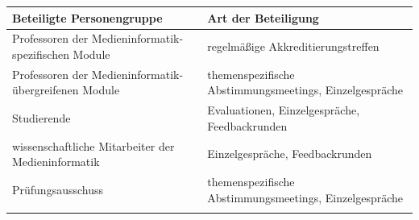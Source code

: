 \begin{longtable}[c]{@{}ll@{}}
\toprule
\begin{minipage}[b]{0.5\columnwidth}\raggedright\strut
Beteiligte Personengruppe
\strut\end{minipage} &
\begin{minipage}[b]{0.5\columnwidth}\raggedright\strut
Art der Beteiligung
\strut\end{minipage}\tabularnewline
\midrule
\endhead
\begin{minipage}[t]{0.5\columnwidth}\raggedright\strut
Professoren der Medieninformatik-spezifischen Module
\strut\end{minipage} &
\begin{minipage}[t]{0.5\columnwidth}\raggedright\strut
regelmäßige Akkreditierungstreffen
\strut\end{minipage}\tabularnewline
\begin{minipage}[t]{0.5\columnwidth}\raggedright\strut
Professoren der Medieninformatik-übergreifenen Module
\strut\end{minipage} &
\begin{minipage}[t]{0.5\columnwidth}\raggedright\strut
themenspezifische Abstimmungsmeetings, Einzelgespräche
\strut\end{minipage}\tabularnewline
\begin{minipage}[t]{0.5\columnwidth}\raggedright\strut
Studierende
\strut\end{minipage} &
\begin{minipage}[t]{0.5\columnwidth}\raggedright\strut
Evaluationen, Einzelgespräche, Feedbackrunden
\strut\end{minipage}\tabularnewline
\begin{minipage}[t]{0.5\columnwidth}\raggedright\strut
wissenschaftliche Mitarbeiter der Medieninformatik
\strut\end{minipage} &
\begin{minipage}[t]{0.5\columnwidth}\raggedright\strut
Einzelgespräche, Feedbackrunden
\strut\end{minipage}\tabularnewline
\begin{minipage}[t]{0.5\columnwidth}\raggedright\strut
Prüfungsausschuss
\strut\end{minipage} &
\begin{minipage}[t]{0.5\columnwidth}\raggedright\strut
themenspezifische Abstimmungsmeetings, Einzelgespräche
\strut\end{minipage}\tabularnewline
\begin{minipage}[t]{0.5\columnwidth}\raggedright\strut

\end{minipage}
\end{longtable}
